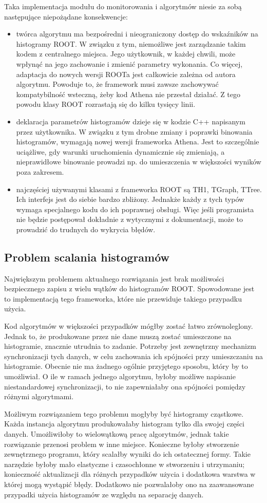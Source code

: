 Taka implementacja modułu do monitorowania i algorytmów niesie za sobą następujące niepożądane konsekwencje:

\begin{itemize}
\item twórca algorytmu ma bezpośredni i nieograniczony dostęp do wskaźników na histogramy ROOT. 
W związku z tym, niemożliwe jest zarządzanie takim kodem z centralnego miejsca.
Jego użytkownik, w każdej chwili, może wpłynąć na jego zachowanie i zmienić parametry wykonania.
Co więcej, adaptacja do nowych wersji ROOTa jest całkowicie zależna od autora algorytmu. 
Powoduje to, że framework musi zawsze zachowywać kompatybilność wsteczną, żeby kod Athena nie przestał działać.
Z tego powodu klasy ROOT rozrastają się do kilku tysięcy linii.
\item deklaracja parametrów histogramów dzieje się w kodzie C++ napisanym przez użytkownika. 
W związku z tym drobne zmiany i poprawki binowania histogramów, wymagają nowej wersji frameworka Athena. 
Jest to szczególnie uciążliwe, gdy warunki uruchomienia dynamicznie się zmieniają, a nieprawidłowe binowanie prowadzi np. do umieszczenia w większości wyników poza zakresem.
\item najczęściej używanymi klasami z frameworka ROOT są TH1, TGraph, TTree. 
Ich interfejs jest do siebie bardzo zbliżony. 
Jednakże każdy z tych typów wymaga specjalnego kodu do ich poprawnej obsługi. 
Więc jeśli programista nie będzie postępował dokładnie z wytycznymi z dokumentacji, może to prowadzić do trudnych do wykrycia błędów. 
\end{itemize}

\subsection{Problem scalania histogramów}
Największym problemem aktualnego rozwiązania jest brak możliwości bezpiecznego zapisu z wielu wątków do histogramów ROOT.
Spowodowane jest to implementacją tego frameworka, które nie przewiduje takiego przypadku użycia. 

Kod algorytmów w większości przypadków mógłby zostać łatwo zrównoleglony.
Jednak to, że produkowane przez nie dane muszą zostać umieszczone na histogramie, znacznie utrudnia to zadanie.
Potrzeby jest zewnętrzny mechanizm synchronizacji tych danych, w celu zachowania ich spójności przy umieszczaniu na histogramie.
Obecnie nie ma żadnego ogólnie przyjętego sposobu, który by to umożliwiał.
O ile w ramach jednego algorytmu, byłoby możliwe napisanie niestandardowej synchronizacji, to nie zapewniałaby ona spójności pomiędzy różnymi algorytmami.

Możliwym rozwiązaniem tego problemu mogłyby być histogramy cząstkowe.
Każda instancja algorytmu produkowałaby histogram tylko dla swojej części danych.
Umożliwiłoby to wielowątkową pracę algorytmów, jednak takie rozwiązanie przenosi problem w inne miejsce. 
Konieczne byłoby stworzenie zewnętrznego programu, który scalałby wyniki do ich ostatecznej formy.
Takie narzędzie byłoby mało elastyczne i czasochłonne w stworzeniu i utrzymaniu; konieczność aktualizacji dla różnych przypadków użycia i dodatkowa warstwa w której mogą wystąpić błędy. 
Dodatkowo nie pozwalałoby ono na zaawansowane przypadki użycia histogramów ze względu na separację danych.